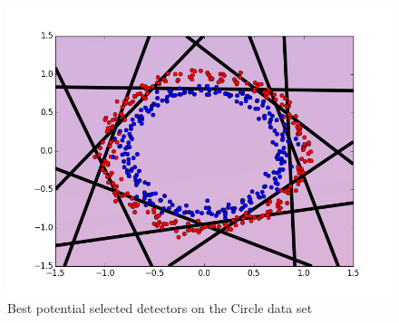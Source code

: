 \begin{figure}[H]
\centering
\includegraphics[scale=0.6]{figs/Circle/9999999-combined_selected_before_combination}
\caption{Best potential selected detectors on the Circle data set}
\label{fig::combined_circle_roc}
\end{figure}




